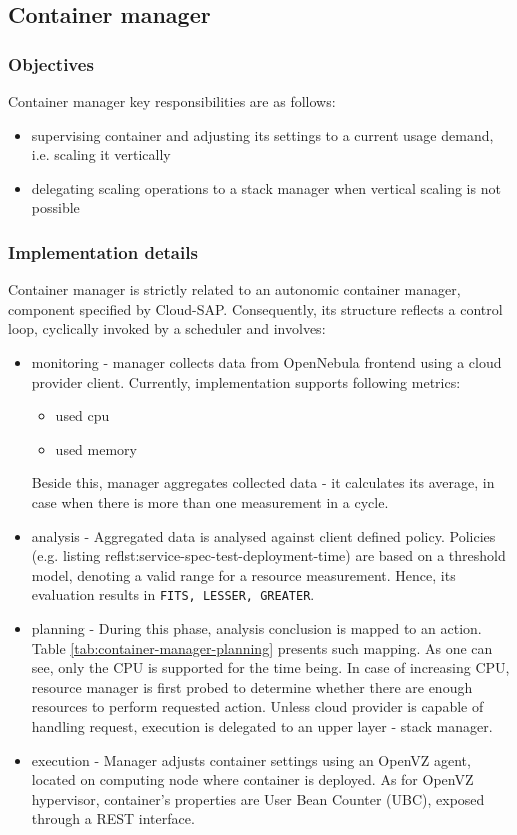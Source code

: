 \subsection{Container manager}

\subsubsection{Objectives}
Container manager key responsibilities are as follows:
\begin{itemize}
 \item supervising container and adjusting its settings to a current usage demand, i.e. scaling it vertically
 \item delegating scaling operations to a stack manager when vertical scaling is not possible
\end{itemize}

\subsubsection{Implementation details}
Container manager is strictly related to an autonomic container manager, component specified by Cloud-SAP. Consequently, its structure reflects a control loop, cyclically invoked by a scheduler and involves:
\begin{itemize}
 \item monitoring - manager collects data from OpenNebula frontend using a cloud provider client. Currently, implementation supports following metrics:
    \begin{itemize}
     \item used cpu
     \item used memory
    \end{itemize}
    Beside this, manager aggregates collected data - it calculates its average, in case when there is more than one measurement in a cycle.
    
 \item analysis - Aggregated data is analysed against client defined policy. Policies (e.g. listing ref{lst:service-spec-test-deployment-time}) are based on a threshold model, denoting a valid range for a resource measurement. Hence, its evaluation results in \texttt{FITS, LESSER, GREATER}.
 
 \item planning - During this phase, analysis conclusion is mapped to an action. Table \ref{tab:container-manager-planning} presents such mapping. As one can see, only the CPU is supported for the time being. In case of increasing CPU, resource manager is first probed to determine whether there are enough resources to perform requested action. Unless cloud provider is capable of handling request, execution is delegated to an upper layer - stack manager.
 
 \item execution - Manager adjusts container settings using an OpenVZ agent, located on computing node where container is deployed. As for OpenVZ hypervisor, container's properties are User Bean Counter (UBC), exposed through a REST interface.
\end{itemize}

